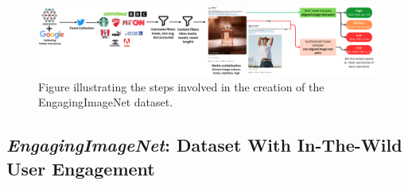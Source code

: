  
 
 
 
 

 
 
 
 
\begin{landscape}    
     \begin{figure}[]
         \centering
         \includegraphics[width=1.5\textwidth]{images/boigbench_data_creation_compressed.pdf}
         \caption{\label{fig:EngagingImageNet_data_creation}
         Figure illustrating the steps involved in the creation of the EngagingImageNet dataset.}
       \end{figure}
\end{landscape} 
 
 \subsection{\textit{EngagingImageNet}: Dataset With In-The-Wild User Engagement}
 \label{ref:setup}
 \label{sec:EngagingImageNet}
 
